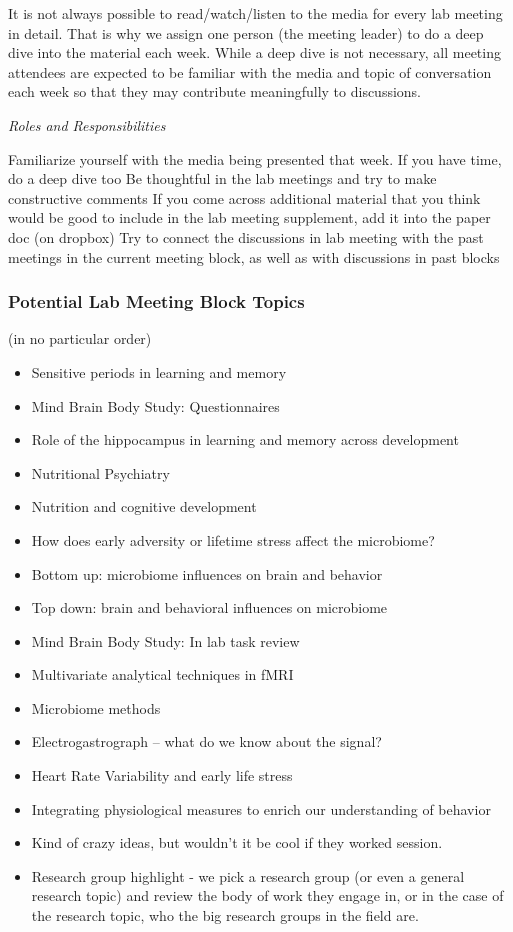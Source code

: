 \documentclass[]{book}
\providecommand{\tightlist}{%
  \setlength{\itemsep}{0pt}\setlength{\parskip}{0pt}}
\begin{document}
It is not always possible to read/watch/listen to the media for every lab meeting in detail. That is why we assign one person (the meeting leader) to do a deep dive into the material each week. While a deep dive is not necessary, all meeting attendees are expected to be familiar with the media and topic of conversation each week so that they may contribute meaningfully to discussions.

\emph{Roles and Responsibilities}

Familiarize yourself with the media being presented that week. If you have time, do a deep dive too
Be thoughtful in the lab meetings and try to make constructive comments
If you come across additional material that you think would be good to include in the lab meeting supplement, add it into the paper doc (on dropbox)
Try to connect the discussions in lab meeting with the past meetings in the current meeting block, as well as with discussions in past blocks

\hypertarget{potential-lab-meeting-block-topics}{%
\subsubsection{Potential Lab Meeting Block Topics}\label{potential-lab-meeting-block-topics}}

(in no particular order)

\begin{itemize}
\tightlist
\item
  Sensitive periods in learning and memory
\item
  Mind Brain Body Study: Questionnaires
\item
  Role of the hippocampus in learning and memory across development
\item
  Nutritional Psychiatry
\item
  Nutrition and cognitive development
\item
  How does early adversity or lifetime stress affect the microbiome?
\item
  Bottom up: microbiome influences on brain and behavior
\item
  Top down: brain and behavioral influences on microbiome
\item
  Mind Brain Body Study: In lab task review
\item
  Multivariate analytical techniques in fMRI
\item
  Microbiome methods
\item
  Electrogastrograph -- what do we know about the signal?
\item
  Heart Rate Variability and early life stress
\item
  Integrating physiological measures to enrich our understanding of behavior
\item
  Kind of crazy ideas, but wouldn't it be cool if they worked session.
\item
  Research group highlight - we pick a research group (or even a general research topic) and review the body of work they engage in, or in the case of the research topic, who the big research groups in the field are.
\end{itemize}
\end{document}
